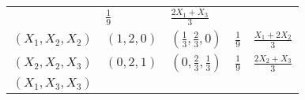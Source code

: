 \documentclass[]{book}
\theoremstyle{break}
\theoremstyle{definition}
\theoremstyle{definition}
\theoremstyle{definition}
\theoremstyle{remark}
\begin{document}
\begin{longtable}[]{@{}lllll@{}}
\begin{minipage}[t]{0.16\columnwidth}
\end{minipage} & \begin{minipage}[t]{0.17\columnwidth}\raggedright\strut
\(\frac{1}{9}\)\strut
\end{minipage} & \begin{minipage}[t]{0.18\columnwidth}\raggedright\strut
\(\frac{2X_1+X_3}{3}\)\strut
\end{minipage}\tabularnewline
\begin{minipage}[t]{0.18\columnwidth}\raggedright\strut
\(\left( X_1,X_2,X_2 \right)\)\strut
\end{minipage} & \begin{minipage}[t]{0.16\columnwidth}\raggedright\strut
\(\left( 1,2,0 \right)\)\strut
\end{minipage} & \begin{minipage}[t]{0.16\columnwidth}\raggedright\strut
\(\left( \frac{1}{3},\frac{2}{3},0 \right)\)\strut
\end{minipage} & \begin{minipage}[t]{0.17\columnwidth}\raggedright\strut
\(\frac{1}{9}\)\strut
\end{minipage} & \begin{minipage}[t]{0.18\columnwidth}\raggedright\strut
\(\frac{X_1+2X_2}{3}\)\strut
\end{minipage}\tabularnewline
\begin{minipage}[t]{0.18\columnwidth}\raggedright\strut
\(\left( X_2,X_2,X_3 \right)\)\strut
\end{minipage} & \begin{minipage}[t]{0.16\columnwidth}\raggedright\strut
\(\left( 0,2,1 \right)\)\strut
\end{minipage} & \begin{minipage}[t]{0.16\columnwidth}\raggedright\strut
\(\left( 0,\frac{2}{3},\frac{1}{3} \right)\)\strut
\end{minipage} & \begin{minipage}[t]{0.17\columnwidth}\raggedright\strut
\(\frac{1}{9}\)\strut
\end{minipage} & \begin{minipage}[t]{0.18\columnwidth}\raggedright\strut
\(\frac{2X_2+X_3}{3}\)\strut
\end{minipage}\tabularnewline
\begin{minipage}[t]{0.18\columnwidth}\raggedright\strut
\(\left( X_1,X_3,X_3 \right)\)\strut
\end{minipage} & \begin{minipage}[t]{0.16\columnwidth}\raggedright\strut

\end{minipage}
\end{longtable}
\end{document}
